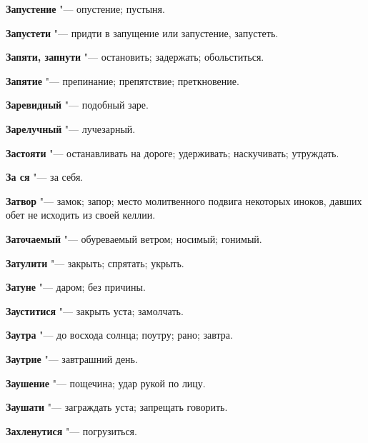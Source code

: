 \begin{mymulticols}{2}
\noindent\textbf{Запустение} "--- опустение; пустыня. 




\noindent\textbf{Запустети} "--- придти в запущение или запустение, запустеть. 




\noindent\textbf{Запяти, запнути} "--- остановить; задержать; обольститься. 




\noindent\textbf{Запятие} "--- препинание; препятствие; преткновение. 




\noindent\textbf{Заревидный} "--- подобный заре. 




\noindent\textbf{Зарелучный} "--- лучезарный. 




\noindent\textbf{Застояти} "--- останавливать на дороге; удерживать; наскучивать; утруждать. 




\noindent\textbf{За ся} "--- за себя. 




\noindent\textbf{Затвор} "--- замок; запор; место молитвенного подвига некоторых иноков, давших обет не исходить из своей келлии. 




\noindent\textbf{Заточаемый} "--- обуреваемый ветром; носимый; гонимый. 




\noindent\textbf{Затулити} "--- закрыть; спрятать; укрыть. 




\noindent\textbf{Затуне} "--- даром; без причины. 




\noindent\textbf{Зауститися} "--- закрыть уста; замолчать. 




\noindent\textbf{Заутра} "--- до восхода солнца; поутру; рано; завтра. 




\noindent\textbf{Заутрие} "--- завтрашний день. 




\noindent\textbf{Заушение} "--- пощечина; удар рукой по лицу. 




\noindent\textbf{Заушати} "--- заграждать уста; запрещать говорить. 




\noindent\textbf{Захленутися} "--- погрузиться. 





\end{mymulticols}
